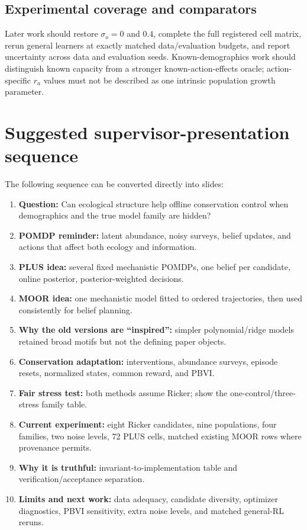 \documentclass[11pt]{article}
\begin{document}
\subsection{Experimental coverage and comparators}

Later work should restore $\sigma_o=0$ and $0.4$, complete the full registered cell matrix, rerun
general learners at exactly matched data/evaluation budgets, and report uncertainty across data and
evaluation seeds. Known-demographics work should distinguish known capacity from a stronger
known-action-effects oracle; action-specific $r_a$ values must not be described as one intrinsic
population growth parameter.

\section{Suggested supervisor-presentation sequence}

The following sequence can be converted directly into slides:

\begin{enumerate}
  \item \textbf{Question:} Can ecological structure help offline conservation control when
  demographics and the true model family are hidden?
  \item \textbf{POMDP reminder:} latent abundance, noisy surveys, belief updates, and actions that
  affect both ecology and information.
  \item \textbf{PLUS idea:} several fixed mechanistic POMDPs, one belief per candidate, online
  posterior, posterior-weighted decisions.
  \item \textbf{MOOR idea:} one mechanistic model fitted to ordered trajectories, then used
  consistently for belief planning.
  \item \textbf{Why the old versions are ``inspired'':} simpler polynomial/ridge models retained
  broad motifs but not the defining paper objects.
  \item \textbf{Conservation adaptation:} interventions, abundance surveys, episode resets,
  normalized states, common reward, and PBVI.
  \item \textbf{Fair stress test:} both methods assume Ricker; show the one-control/three-stress
  family table.
  \item \textbf{Current experiment:} eight Ricker candidates, nine populations, four families, two
  noise levels, 72 PLUS cells, matched existing MOOR rows where provenance permits.
  \item \textbf{Why it is truthful:} invariant-to-implementation table and verification/acceptance
  separation.
  \item \textbf{Limits and next work:} data adequacy, candidate diversity, optimizer diagnostics,
  PBVI sensitivity, extra noise levels, and matched general-RL reruns.
\end{enumerate}
\end{document}
